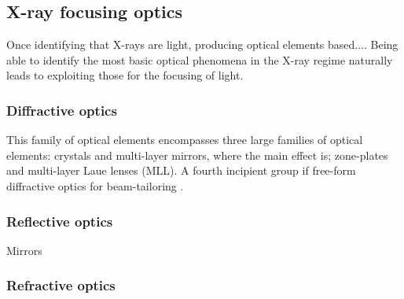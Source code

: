 \begin{refsection}
\subsection{X-ray focusing optics}
Once identifying that X-rays are light, producing optical elements based....
Being able to identify the most basic optical phenomena in the X-ray regime naturally leads to exploiting those for the focusing of light.

\subsubsection*{Diffractive optics}

This family of optical elements encompasses three large families of optical elements: crystals and multi-layer mirrors, where the main effect is; zone-plates and multi-layer Laue lenses (MLL). A fourth incipient group if free-form diffractive optics for beam-tailoring . 

\subsubsection*{Reflective optics}\label{sec:reflec}
Mirrors 


\subsubsection*{Refractive optics}


\end{refsection}
